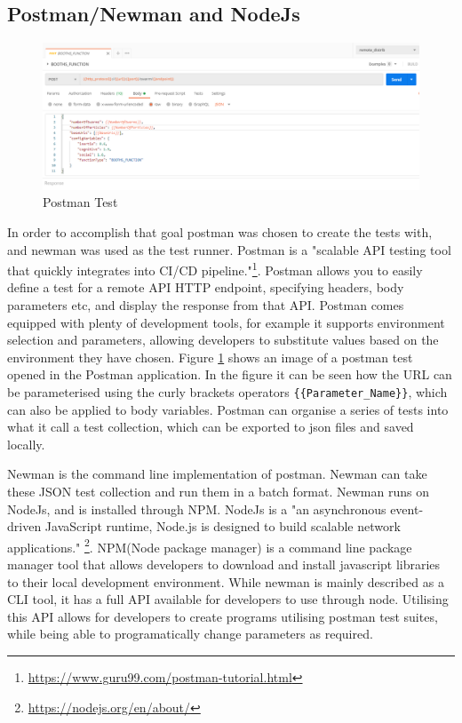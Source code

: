 \documentclass[oneside,12pt]{book}
\begin{document}
\subsection{Postman/Newman and NodeJs}
\begin{figure}[H]
    \centering
    \includegraphics[scale=0.4]{Images/PostmanTest.png}
    \caption{Postman Test}
    \label{fig:PostmanTest}
\end{figure}
In order to accomplish that goal postman was chosen to create the tests with, and newman was used as the test runner. Postman is a "scalable API testing tool that quickly integrates into CI/CD pipeline."\footnote{\url{https://www.guru99.com/postman-tutorial.html}}. Postman allows you to easily define a test for a remote API HTTP endpoint, specifying headers, body parameters etc, and display the response from that API. Postman comes equipped with plenty of development tools, for example it supports environment selection and parameters, allowing developers to substitute values based on the environment they have chosen. Figure \ref{fig:PostmanTest} shows an image of a postman test opened in the Postman application. In the figure it can be seen how the URL can be parameterised using the curly brackets operators \verb|{{Parameter_Name}}|, which can also be applied to body variables.  Postman can organise a series of tests into what it call a test collection, which can be exported to json files and saved locally. 


Newman is the command line implementation of postman. Newman can take these JSON test collection and run them in a batch format. Newman runs on NodeJs, and is installed through NPM. NodeJs is a "an asynchronous event-driven JavaScript runtime, Node.js is designed to build scalable network applications." \footnote{\url{https://nodejs.org/en/about/}}. NPM(Node package manager) is a command line package manager tool that allows developers to download and install javascript libraries to their local development environment. While newman is mainly described as a CLI tool, it has a full API available for developers to use through node. Utilising this API allows for developers to create programs utilising postman test suites, while being able to programatically change parameters as required. 
\end{document}
